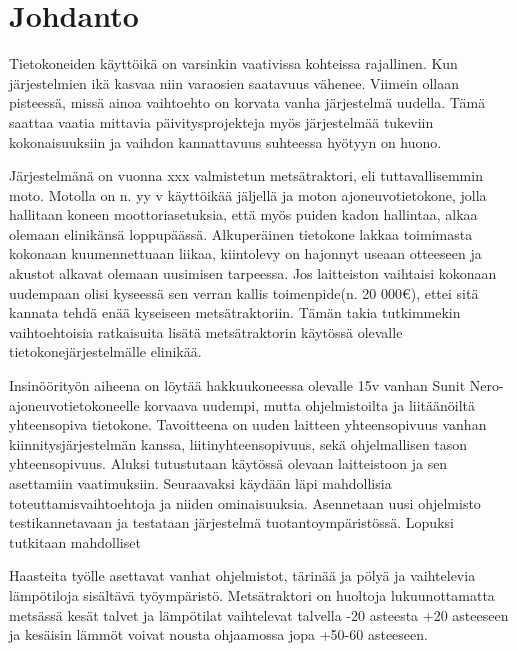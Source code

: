 \documentclass[11pt,a4paper,oneside,article]{memoir}
\begin{document}
\newpage

\pagestyle{plain}

\setcounter{page}{1} %
\ClearWallPaper

\chapter{Johdanto}

Tietokoneiden käyttöikä on varsinkin vaativissa kohteissa rajallinen.
Kun järjestelmien ikä kasvaa niin varaosien saatavuus vähenee. Viimein
ollaan pisteessä, missä ainoa vaihtoehto on korvata vanha järjestelmä
uudella. Tämä saattaa vaatia mittavia päivitysprojekteja myös
järjestelmää tukeviin kokonaisuuksiin ja vaihdon kannattavuus suhteessa
hyötyyn on huono.

Järjestelmänä on vuonna xxx valmistetun metsätraktori, eli
tuttavallisemmin moto. Motolla on n. yy v käyttöikää jäljellä ja moton
ajoneuvotietokone, jolla hallitaan koneen moottoriasetuksia, että myös
puiden kadon hallintaa, alkaa olemaan elinikänsä loppupäässä.
Alkuperäinen tietokone lakkaa toimimasta kokonaan kuumennettuaan liikaa,
kiintolevy on hajonnyt useaan otteeseen ja akustot alkavat olemaan
uusimisen tarpeessa. Jos laitteiston vaihtaisi kokonaan uudempaan olisi
kyseessä sen verran kallis toimenpide(n. 20 000\euro{}), ettei sitä
kannata tehdä enää kyseiseen metsätraktoriin. Tämän takia tutkimmekin
vaihtoehtoisia ratkaisuita lisätä metsätraktorin käytössä olevalle
tietokonejärjestelmälle elinikää.

Insinöörityön aiheena on löytää hakkuukoneessa olevalle 15v vanhan Sunit
Nero-ajoneuvotietokoneelle korvaava uudempi, mutta ohjelmistoilta ja liitäänöiltä yhteensopiva
tietokone. Tavoitteena on uuden laitteen yhteensopivuus vanhan
kiinnitysjärjestelmän kanssa, liitinyhteensopivuus, sekä ohjelmallisen
tason yhteensopivuus. Aluksi tutustutaan käytössä olevaan laitteistoon
ja sen asettamiin vaatimuksiin. Seuraavaksi käydään läpi mahdollisia
toteuttamisvaihtoehtoja ja niiden ominaisuuksia. Asennetaan uusi
ohjelmisto testikannetavaan ja testataan järjestelmä
tuotantoympäristössä. Lopuksi tutkitaan mahdolliset

Haasteita työlle asettavat vanhat ohjelmistot, tärinää ja pölyä ja
vaihtelevia lämpötiloja sisältävä työympäristö. Metsätraktori on
huoltoja lukuunottamatta metsässä kesät talvet ja lämpötilat vaihtelevat
talvella -20 asteesta +20 asteeseen ja kesäisin lämmöt voivat nousta
ohjaamossa jopa +50-60 asteeseen.
\end{document}
